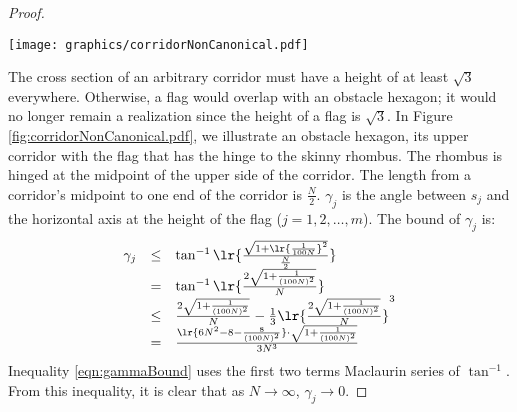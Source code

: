 \begin{proof}
\begin{minipage}{\linewidth}
\begin{center}
\texttt{[image: graphics/corridorNonCanonical.pdf]}
\label{fig:corridorNonCanonical.pdf}
\end{center}
\end{minipage}

The cross section of an arbitrary corridor must have a height of at least $\sqrt{3}$ everywhere. 
Otherwise, a flag would overlap with an obstacle hexagon; it would no longer remain a realization since the height of a flag is $\sqrt{3}$.
In Figure \ref{fig:corridorNonCanonical.pdf}, we illustrate an obstacle hexagon, its upper corridor with the flag that has the hinge to the skinny rhombus.  
The rhombus is hinged at the midpoint of the upper side of the corridor.
The length from a corridor's midpoint to one end of the corridor is $\frac{N}{2}$.
$\gamma_j$ is the angle between $s_j$ and the horizontal axis at the height of the flag ($j = 1,2,\ldots, m$).
The bound of $\gamma_j$ is:
\begin{equation}\label{eqn:gammaBound}
\begin{array}{rcl}
\gamma_j &\leq & \tan^{-1} \lr{
								\frac{
										\sqrt{1+ \lr{	\frac{1}{100N}	}^2}
								}{
										\frac{N}{2}
								}	
							}\\
&=& \tan^{-1} \lr{\frac{2\sqrt{1 + \frac{1}{(100N)^2}}}{N}}\\
&\leq& \frac{2\sqrt{1 + \frac{1}{(100N)^2}}}{N} - \frac{1}{3}\lr{\frac{2\sqrt{1 + \frac{1}{(100N)^2}}}{N}}^3\\
&=&\frac{\lr{6N^2 - 8 - \frac{8}{(100N)^2}}\cdot \sqrt{1 + \frac{1}{(100N)^2}} }{3N^3}
\end{array} 
\end{equation}
Inequality \ref{eqn:gammaBound} uses the first two terms Maclaurin series of $\tan^{-1}$.
From this inequality, it is clear that as $N \rightarrow \infty$, $\gamma_j \rightarrow 0$.





\end{proof}

